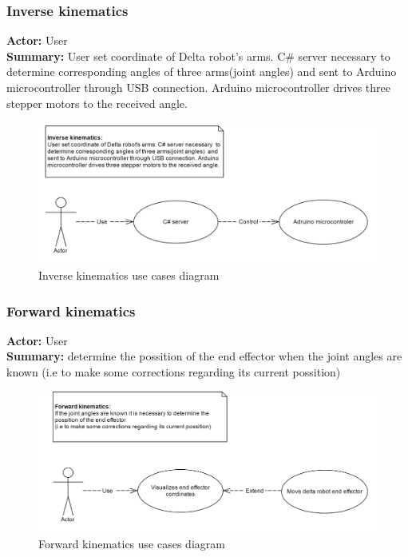 \subsubsection{Inverse kinematics}
\textbf{Actor:} User \\
\textbf{Summary:} User set coordinate of Delta robot's arms. C\# server necessary  to determine corresponding angles of three arms(joint angles)  and sent to Arduino microcontroller through USB connection. Arduino microcontroller drives three stepper motors to the received angle.
\begin{figure}[H]
	\centering
	\includegraphics[width=\maxwidth{15cm}, keepaspectratio]{Chapters/Fig/usecase_inverse_kinematics.png}
	\caption{Inverse kinematics use cases diagram}
	\label{fig:usecase_inverse_kinematics}
\end{figure}

\subsubsection{Forward kinematics}
\textbf{Actor:} User \\
\textbf{Summary:} determine the possition of the end effector when the joint angles are known (i.e to make some corrections regarding its current possition)
\begin{figure}[H]
	\centering
	\includegraphics[width=\maxwidth{15cm}, keepaspectratio]{Chapters/Fig/usecase_forward_kinematics.png}
	\caption{Forward kinematics use cases diagram}
	\label{fig:usecase_forward_kinematics}
\end{figure}

